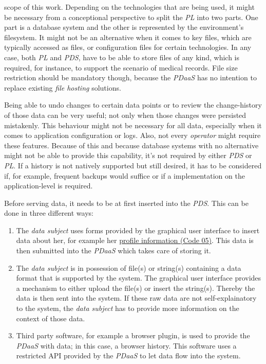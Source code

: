 \documentclass[12pt,english,a4paper,titlepage,cleardoublepage=empty,dottedtoc]{report}
\providecommand{\tightlist}{%
  \setlength{\itemsep}{0pt}\setlength{\parskip}{0pt}}
\begin{document}
scope of this work. Depending on the technologies that are being used,
it might be necessary from a conceptional perspective to split the
\emph{PL} into two parts. One part is a database system and the other is
represented by the environment's filesystem. It might not be an
alternative when it comes to key files, which are typically accessed as
files, or configuration files for certain technologies. In any case,
both \emph{PL} and \emph{PDS}, have to be able to store files of any
kind, which is required, for instance, to support the scenario of
medical records. File size restriction should be mandatory though,
because the \emph{PDaaS} has no intention to replace existing \emph{file
hosting} solutions.

Being able to undo changes to certain data points or to review the
change-history of those data can be very useful; not only when those
changes were persisted mistakenly. This behaviour might not be necessary
for all data, especially when it comes to application configuration or
logs. Also, not every \emph{operator} might require these features.
Because of this and because database systems with no alternative might
not be able to provide this capability, it's not required by either
\emph{PDS} or \emph{PL}. If a history is not natively supported but
still desired, it has to be considered if, for example, frequent backups
would suffice or if a implementation on the application-level is
required.

Before serving data, it needs to be at first inserted into the
\emph{PDS}. This can be done in three different ways:

\begin{enumerate}
\def\labelenumi{\alph{enumi})}
\tightlist
\item
  The \emph{data subject} uses forms provided by the graphical user
  interface to insert data about her, for example her
  \protect\hyperlink{code-05_struct_profile}{profile information (Code
  05)}. This data is then submitted into the \emph{PDaaS} which takes
  care of storing it.
\item
  The \emph{data subject} is in possession of file(s) or string(s)
  containing a data format that is supported by the system. The
  graphical user interface provides a mechanism to either upload the
  file(s) or insert the string(s). Thereby the data is then sent into
  the system. If these raw data are not self-explainatory to the system,
  the \emph{data subject} has to provide more information on the context
  of those data.
\item
  Third party software, for example a browser plugin, is used to provide
  the \emph{PDaaS} with data; in this case, a browser history. This
  software uses a restricted API provided by the \emph{PDaaS} to let
  data flow into the system.
\end{enumerate}
\end{document}
